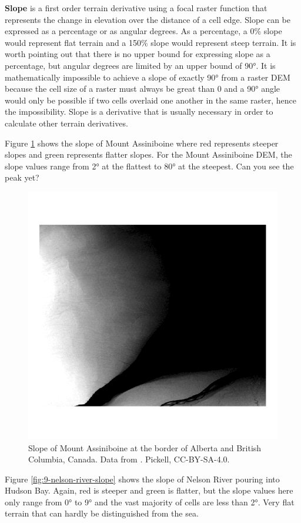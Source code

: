 \documentclass[
]{book}
\begin{document}
\textbf{Slope} is a first order terrain derivative using a focal raster function that represents the change in elevation over the distance of a cell edge. Slope can be expressed as a percentage or as angular degrees. As a percentage, a 0\% slope would represent flat terrain and a 150\% slope would represent steep terrain. It is worth pointing out that there is no upper bound for expressing slope as a percentage, but angular degrees are limited by an upper bound of 90°. It is mathematically impossible to achieve a slope of exactly 90° from a raster DEM because the cell size of a raster must always be great than 0 and a 90° angle would only be possible if two cells overlaid one another in the same raster, hence the impossibility. Slope is a derivative that is usually necessary in order to calculate other terrain derivatives.

Figure \ref{fig:9-mount-assiniboine-slope} shows the slope of Mount Assiniboine where red represents steeper slopes and green represents flatter slopes. For the Mount Assiniboine DEM, the slope values range from 2° at the flattest to 80° at the steepest. Can you see the peak yet?



\begin{figure}
\includegraphics[width=0.75\linewidth]{images/09-nelson-river-dem} \caption{Slope of Mount Assiniboine at the border of Alberta and British Columbia, Canada. Data from \citep{natural_resources_canada_canadian_2015}. Pickell, CC-BY-SA-4.0.}\label{fig:9-mount-assiniboine-slope}
\end{figure}

Figure \ref{fig:9-nelson-river-slope} shows the slope of Nelson River pouring into Hudson Bay. Again, red is steeper and green is flatter, but the slope values here only range from 0° to 9° and the vast majority of cells are less than 2°. Very flat terrain that can hardly be distinguished from the sea.
\end{document}

